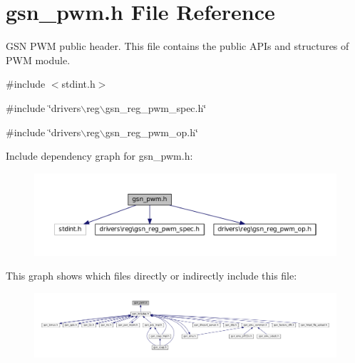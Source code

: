 \hypertarget{a00540}{
\section{gsn\_\-pwm.h File Reference}
\label{a00540}
}


GSN PWM public header. This file contains the public APIs and structures of PWM module.  


{\ttfamily \#include $<$stdint.h$>$}\par
{\ttfamily \#include \char`\"{}drivers$\backslash$reg$\backslash$gsn\_\-reg\_\-pwm\_\-spec.h\char`\"{}}\par
{\ttfamily \#include \char`\"{}drivers$\backslash$reg$\backslash$gsn\_\-reg\_\-pwm\_\-op.h\char`\"{}}\par
Include dependency graph for gsn\_\-pwm.h:
\nopagebreak
\begin{figure}[H]
\begin{center}
\leavevmode
\includegraphics[width=400pt]{a00777}
\end{center}
\end{figure}
This graph shows which files directly or indirectly include this file:
\nopagebreak
\begin{figure}[H]
\begin{center}
\leavevmode
\includegraphics[width=400pt]{a00778}
\end{center}
\end{figure}
